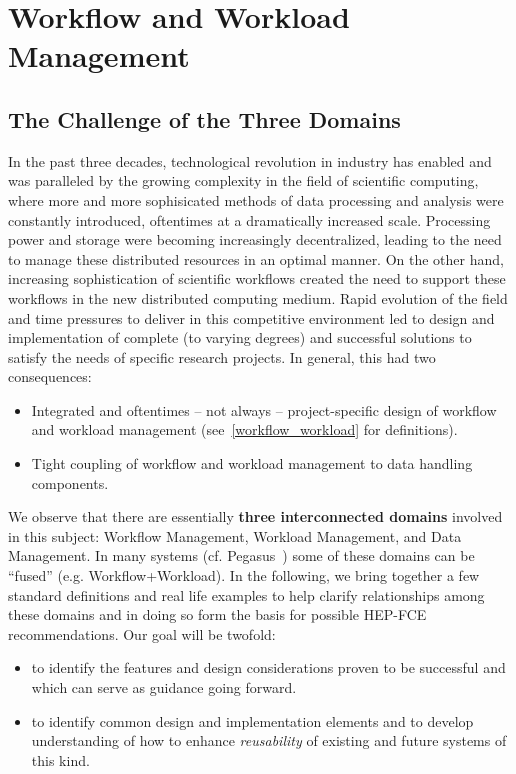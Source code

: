\section{Workflow and Workload Management}
\label{wms}

\subsection{The Challenge of the Three Domains}
\label{3domains}
In the past three decades, technological revolution in industry has enabled and was paralleled by the growing complexity in the field of scientific computing, where 
more and more sophisicated methods of data processing and analysis were constantly introduced, oftentimes at a dramatically increased scale.
Processing power and storage were becoming increasingly decentralized, leading to the need to manage these distributed resources in an optimal manner.
On the other hand, increasing sophistication of scientific workflows created the need to support these workflows in the new distributed computing medium.
Rapid evolution of the field and time pressures to deliver in this competitive environment led to design and implementation of complete (to varying degrees)
and successful solutions to satisfy the needs of specific  research projects. In general, this had two consequences:

\begin{itemize}
\item Integrated and oftentimes -- not always -- project-specific design of workflow and workload management (see~\ref{workflow_workload} for definitions).
\item Tight coupling of workflow and workload management to data handling components.
\end{itemize}

We observe that there are essentially \textbf{three interconnected domains} involved in this subject: Workflow Management, Workload Management,
and Data Management. In many systems (cf. Pegasus~\cite{pegasus}) some of these domains can be ``fused'' (e.g. Workflow+Workload).
In the following, we  bring together a few standard definitions and real life examples to help clarify
relationships among these domains and in doing so form the basis for possible HEP-FCE recommendations. Our goal will be twofold:
\begin{itemize}
\item to identify the features and design considerations proven to be successful and which can serve as guidance going forward.
\item to identify common design and implementation elements and to develop understanding of how to enhance \textit{reusability} of existing and future systems of this kind.
\end{itemize}

